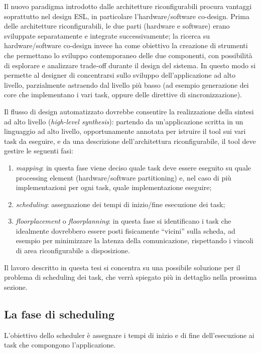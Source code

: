 Il nuovo paradigma introdotto dalle architetture riconfigurabili procura vantaggi
soprattutto nel design \ac{ESL}, in particolare l'\mbox{hardware/software} co-design.
Prima delle architetture riconfigurabili, le due parti (hardware e software) erano
sviluppate separatamente e integrate successivamente; la ricerca su 
\mbox{hardware/software} co-design invece ha come obiettivo la creazione di strumenti che 
permettano lo sviluppo contemporaneo delle due componenti, con possibilità di esplorare e 
analizzare trade-off durante il design del sistema. In questo modo si permette al 
designer di concentrarsi sullo sviluppo dell'applicazione ad alto livello, parzialmente 
astraendo dal livello più basso (ad esempio generazione dei core che implementano i vari 
task, oppure delle direttive di sincronizzazione).

Il flusso di design automatizzato dovrebbe consentire la realizzazione della sintesi ad 
alto livello (\emph{high-level synthesis}): partendo da un'applicazione scritta in un
linguaggio ad alto livello, opportunamente annotata per istruire il tool sui vari task
da eseguire, e da una descrizione dell'architettura riconfigurabile, il tool deve gestire
le seguenti fasi:
\begin{enumerate}
 \item \emph{mapping}: in questa fase viene deciso quale task deve essere eseguito su 
quale processing 
element (\mbox{hardware/software} partitioning) e, nel caso di più implementazioni per 
ogni task, quale implementazione eseguire;
 \item \emph{scheduling}: assegnazione dei tempi di inizio/fine esecuzione dei task;
 \item \emph{floorplacement} o \emph{floorplanning}: in questa fase si identificano i 
task che idealmente dovrebbero essere posti fisicamente ``vicini'' sulla scheda, ad 
esempio per minimizzare la latenza della comunicazione, rispettando i vincoli di area 
riconfigurabile a disposizione.
\end{enumerate}

Il lavoro descritto in questa tesi si concentra su una possibile soluzione per il 
problema di scheduling dei task, che verrà spiegato più in dettaglio nella prossima 
sezione.


\subsection{La fase di scheduling}
L'obiettivo dello scheduler è assegnare i tempi di inizio e di fine dell'esecuzione ai
task che compongono l'applicazione.

